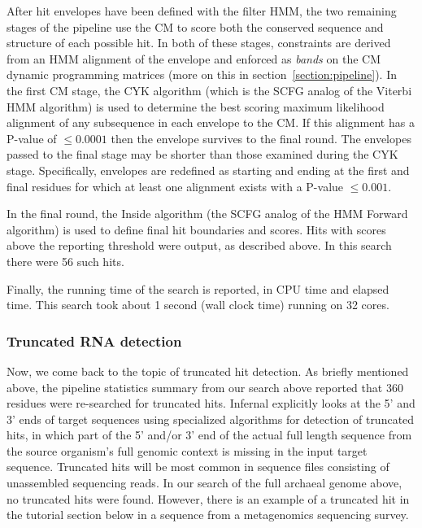 After hit envelopes have been defined with the filter HMM, the two
remaining stages of the pipeline use the CM to score both the
conserved sequence and structure of each possible hit. In both of
these stages, constraints are derived from an HMM alignment of the
envelope and enforced as \emph{bands} on the CM dynamic programming
matrices (more on this in section~\ref{section:pipeline}). In the
first CM stage, the CYK algorithm (which is the SCFG analog of the
Viterbi HMM algorithm) is used to determine the best scoring maximum
likelihood alignment of any subsequence in each envelope to the CM. If
this alignment has a P-value of $\leq 0.0001$ then the envelope
survives to the final round. The envelopes passed to the final stage
may be shorter than those examined during the CYK stage. Specifically,
envelopes are redefined as starting and ending at the first and final
residues for which at least one alignment exists with a P-value $\leq
0.001$.

In the final round, the Inside algorithm (the SCFG analog of the HMM
Forward algorithm) is used to define final hit boundaries and
scores. Hits with scores above the reporting threshold were output, as
described above. In this search there were 56 such hits.

Finally, the running time of the search is reported, in CPU time and
elapsed time. This search took about 1 second (wall
clock time) running on 32 cores. 
\subsubsection{Truncated RNA detection}

Now, we come back to the topic of truncated hit detection.  As briefly
mentioned above, the pipeline statistics summary from our search above
reported that 360 residues were re-searched for truncated
hits. Infernal explicitly looks at the 5' and 3' ends of target
sequences using specialized algorithms for detection of truncated
hits, in which part of the 5' and/or 3' end of the actual full length
sequence from the source organism's full genomic context is missing in
the input target sequence. Truncated hits will be most common in
sequence files consisting of unassembled sequencing reads. In our
search of the full archaeal genome above, no truncated hits were
found. However, there is an example of a truncated hit in the
 tutorial section below in a sequence from a metagenomics
sequencing survey.

